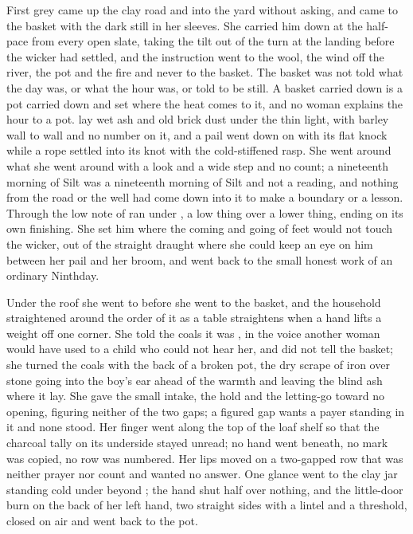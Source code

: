 First grey came up the clay road and into the yard without asking, and  came to the basket with the dark still in her sleeves. She carried him down  at the half-pace from every open slate, taking the tilt out of the turn at the landing before the wicker had settled, and the instruction went to the wool, the wind off the river, the pot and the fire and never to the basket. The basket was not told what the day was, or what the hour was, or told to be still. A basket carried down is a pot carried down and set where the heat comes to it, and no woman explains the hour to a pot.  lay wet ash and old brick dust under the thin light, with barley wall to wall and no number on it, and a pail went down on  with its flat knock while a rope settled into its knot with the cold-stiffened rasp. She went around what she went around with a look and a wide step and no count; a nineteenth morning of Silt was a nineteenth morning of Silt and not a reading, and nothing from the road or the well had come down into it to make a boundary or a lesson. Through  the low note of  ran under , a low thing over a lower thing, ending on its own finishing. She set him where the coming and going of feet would not touch the wicker, out of the straight draught where she could keep an eye on him between her pail and her broom, and went back to the small honest work of an ordinary Ninthday.

Under the roof she went to  before she went to the basket, and the household straightened around the order of it as a table straightens when a hand lifts a weight off one corner. She told the coals it was , in the voice another woman would have used to a child who could not hear her, and did not tell the basket; she turned the coals with the back of a broken pot, the dry scrape of iron over stone going into the boy's ear ahead of the warmth and leaving the blind ash where it lay. She gave the small intake, the hold and the letting-go toward no opening, figuring neither of the two gaps; a figured gap wants a payer standing in it and none stood. Her finger went along the top of the loaf shelf so that the charcoal tally on its underside stayed unread; no hand went beneath, no mark was copied, no row was numbered. Her lips moved on a two-gapped row that was neither prayer nor count and wanted no answer. One glance went to the clay jar standing cold under  beyond ; the hand shut half over nothing, and the little-door burn on the back of her left hand, two straight sides with a lintel and a threshold, closed on air and went back to the pot.

